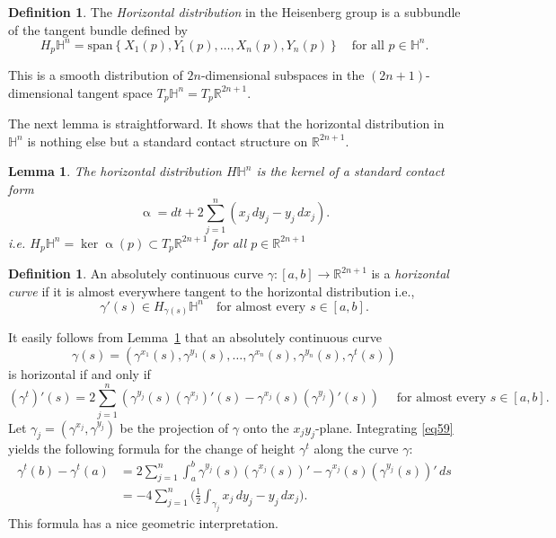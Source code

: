 \documentclass[intlimits,12pt,reqno]{amsart}
\newcommand{\bbbr}{\mathbb R}
\newcommand{\bbbh}{\mathbb H}
\newcommand{\R}{\mathbb R}
\numberwithin{equation}{section}
\newtheorem{lemma}[theorem]{Lemma}
\theoremstyle{definition}
\newtheorem{definition}[theorem]{Definition}
\begin{document}
\begin{definition}
The {\em Horizontal distribution} in the Heisenberg group
is a subbundle of the tangent bundle defined by 
$$
H_p \bbbh^n = \text{span} \left\{ X_1(p),Y_1(p),\dots,X_n(p),Y_n(p) \right\} \quad \text{for all } p \in \bbbh^n.
$$
\end{definition}
This is a smooth distribution of 
$2n$-dimensional subspaces in the 
$(2n+1)$-dimensional tangent space $T_p \bbbh^n = T_p \bbbr^{2n+1}$.

The next lemma is straightforward. It shows that the horizontal distribution in $\bbbh^n$ is nothing else but a standard contact structure on $\R^{2n+1}$.
\begin{lemma}
\label{T38}
The horizontal distribution $H\bbbh^n$ is the kernel of a standard contact form
$$
\upalpha = dt + 2 \sum_{j=1}^n (x_j \, dy_j - y_j \, dx_j).
$$
i.e. $H_p \bbbh^n = \operatorname{ker}\upalpha(p) \subset T_p\R^{2n+1}$ for all $p\in \R^{2n+1}$
\end{lemma}

\begin{definition}
An absolutely continuous curve $\gamma:[a,b] \to \R^{2n+1}$ 
is a \emph{horizontal curve} if it is almost everywhere tangent to the horizontal distribution i.e.,
$$
\gamma'(s) \in H_{\gamma(s)} \bbbh^n \quad \text{for almost every } s \in [a,b].
$$
\end{definition}
It easily follows from Lemma~\ref{T38} that an absolutely continuous curve
$$
\gamma(s)= (\gamma^{x_1}(s),\gamma^{y_1}(s),\dots,\gamma^{x_n}(s),\gamma^{y_n}(s),\gamma^t(s))
$$
is horizontal if and only if
\begin{equation}
\label{eq59}
(\gamma^t)'(s) = 2\sum_{j=1}^n (\gamma^{y_j}(s)(\gamma^{x_j})'(s) - \gamma^{x_j}(s)(\gamma^{y_j})'(s)) \quad \text{ for almost every } s \in [a,b].
\end{equation}
Let $\gamma_j=(\gamma^{x_j},\gamma^{y_j})$ be the projection of $\gamma$ onto the $x_jy_j$-plane. Integrating \eqref{eq59} yields the following formula for the change of height $\gamma^t$ along the curve $\gamma$:
\begin{equation}
\label{eq60}
\begin{split}
\gamma^t(b)-\gamma^t(a)
&=
2\sum_{j=1}^n \int_a^b \gamma^{y_j}(s)(\gamma^{x_j}(s))'-\gamma^{x_j}(s)(\gamma^{y_j}(s))'\, ds\\
&=
-4\sum_{j=1}^n \Bigg(\frac{1}{2}\int_{\gamma_j} x_j\, dy_j-y_j\, dx_j\Bigg).
\end{split}    
\end{equation}
This formula has a nice geometric interpretation.
\end{document}
